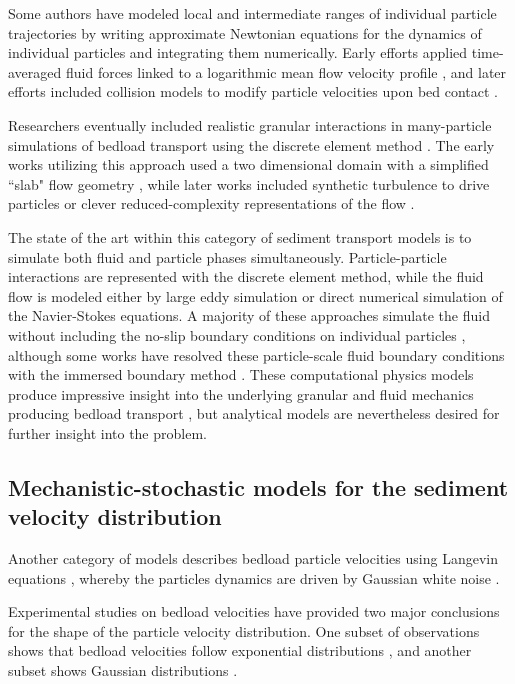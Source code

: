 Some authors have modeled local and intermediate ranges of individual particle trajectories by writing approximate Newtonian equations for the dynamics of individual particles and integrating them numerically. Early efforts applied time-averaged fluid forces linked to a logarithmic mean flow velocity profile \citep{Yalin1963,VanRijn1984}, and later efforts included collision models to modify particle velocities upon bed contact \citep{Wiberg1985,Sekine1992,Nino1998}.

Researchers eventually included realistic granular interactions in many-particle simulations of bedload transport using the discrete element method \citep[e.g.][]{Cundall1979, Wachs2019}.
The early works utilizing this approach used a two dimensional domain with a simplified ``slab" flow geometry \citep{Haff1993,Gotoh1997}, while later works included synthetic turbulence to drive particles \citep{Schmeeckle2003,Maurin2015} or clever reduced-complexity representations of the flow \citep{Clark2015,Clark2017}.

The state of the art within this category of sediment transport models is to simulate both fluid and particle phases simultaneously.
Particle-particle interactions are represented with the discrete element method, while the fluid flow is modeled either by large eddy simulation or direct numerical simulation of the Navier-Stokes equations.
A majority of these approaches simulate the fluid without including the no-slip boundary conditions on individual particles \citep[e.g.][]{Vowinckel2014,Schmeeckle2014,Gonzalez2017}, although some works have resolved these particle-scale fluid boundary conditions with the immersed boundary method \citep[e.g.][]{Ji2013, Ji2014, Elghannay2017, Yousefi2020}.
These computational physics models produce impressive insight into the underlying granular and fluid mechanics producing bedload transport \citep{Frey2011}, but analytical models are nevertheless desired for further insight into the problem.

\subsection{Mechanistic-stochastic models for the sediment velocity distribution}
\label{sec:langevin}

Another category of models describes bedload particle velocities using Langevin equations \citep{Ancey2014,Fan2014}, whereby the particles dynamics are driven by Gaussian white noise \citep{Kubo1978}.

Experimental studies on bedload velocities have provided two major conclusions for the shape of the particle velocity distribution. One subset of observations shows that bedload velocities follow exponential distributions \citep{Lajeunesse2010,Furbish2012,Fathel2015}, and another subset shows Gaussian distributions \citep{Martin2012,Ancey2014,Heyman2016}.

